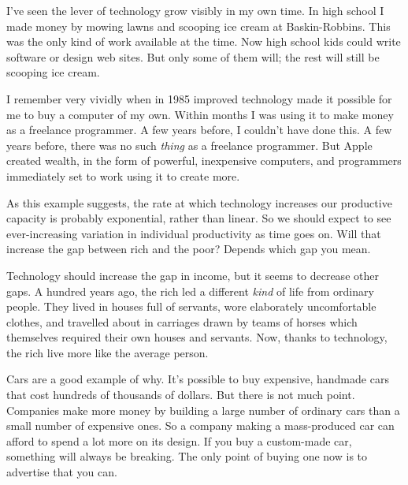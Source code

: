 I've
                  seen the lever of technology grow visibly in my own time. In
                  high school I made money by mowing lawns and scooping ice
                  cream at Baskin-Robbins. This was the only kind of work
                  available at the time. Now high school kids could write
                  software or design web sites. But only some of them will; the
                  rest will still be scooping ice cream.

I remember
                  very vividly when in 1985 improved technology made it possible
                  for me to buy a computer of my own. Within months I was using
                  it to make money as a freelance programmer. A few years
                  before, I couldn't have done this. A few years before, there
                  was no such \emph{thing} as a freelance programmer. But Apple
                  created wealth, in the form of powerful, inexpensive
                  computers, and programmers immediately set to work using it to
                  create more.

As this example suggests, the rate at
                  which technology increases our productive capacity is probably
                  exponential, rather than linear. So we should expect to see
                  ever-increasing variation in individual productivity as time
                  goes on. Will that increase the gap between rich and the poor?
                  Depends which gap you mean.

Technology should
                  increase the gap in income, but it seems to decrease other
                  gaps. A hundred years ago, the rich led a different
                  \emph{kind} of life from ordinary people. They lived in houses
                  full of servants, wore elaborately uncomfortable clothes, and
                  travelled about in carriages drawn by teams of horses which
                  themselves required their own houses and servants. Now, thanks
                  to technology, the rich live more like the average person.

Cars
                  are a good example of why. It's possible to buy expensive,
                  handmade cars that cost hundreds of thousands of dollars. But
                  there is not much point. Companies make more money by building
                  a large number of ordinary cars than a small number of
                  expensive ones. So a company making a mass-produced car can
                  afford to spend a lot more on its design. If you buy a
                  custom-made car, something will always be breaking. The only
                  point of buying one now is to advertise that you can.

